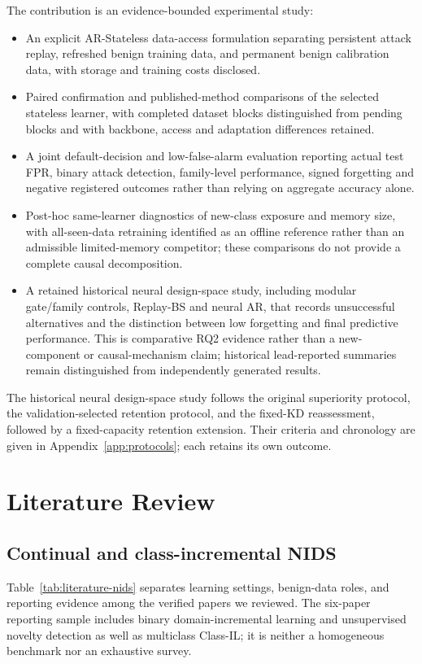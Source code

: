 \documentclass[10pt,twocolumn]{article}
\begin{document}
The contribution is an evidence-bounded experimental study:
\begin{itemize}
\item An explicit AR-Stateless data-access formulation separating persistent attack replay, refreshed benign training data, and permanent benign calibration data, with storage and training costs disclosed.
\item Paired confirmation and published-method comparisons of the selected stateless learner, with completed dataset blocks distinguished from pending blocks and with backbone, access and adaptation differences retained.
\item A joint default-decision and low-false-alarm evaluation reporting actual test FPR, binary attack detection, family-level performance, signed forgetting and negative registered outcomes rather than relying on aggregate accuracy alone.
\item Post-hoc same-learner diagnostics of new-class exposure and memory size, with all-seen-data retraining identified as an offline reference rather than an admissible limited-memory competitor; these comparisons do not provide a complete causal decomposition.
\item A retained historical neural design-space study, including modular gate/family controls, Replay-BS and neural AR, that records unsuccessful alternatives and the distinction between low forgetting and final predictive performance. This is comparative RQ2 evidence rather than a new-component or causal-mechanism claim; historical lead-reported summaries remain distinguished from independently generated results.
\end{itemize}
The historical neural design-space study follows the original superiority protocol, the validation-selected retention protocol, and the fixed-KD reassessment, followed by a fixed-capacity retention extension. Their criteria and chronology are given in Appendix~\ref{app:protocols}; each retains its own outcome.

\section{Literature Review}
\subsection{Continual and class-incremental NIDS}
Table~\ref{tab:literature-nids} separates learning settings, benign-data roles, and reporting evidence among the verified papers we reviewed. The six-paper reporting sample includes binary domain-incremental learning and unsupervised novelty detection as well as multiclass Class-IL; it is neither a homogeneous benchmark nor an exhaustive survey.
\end{document}
